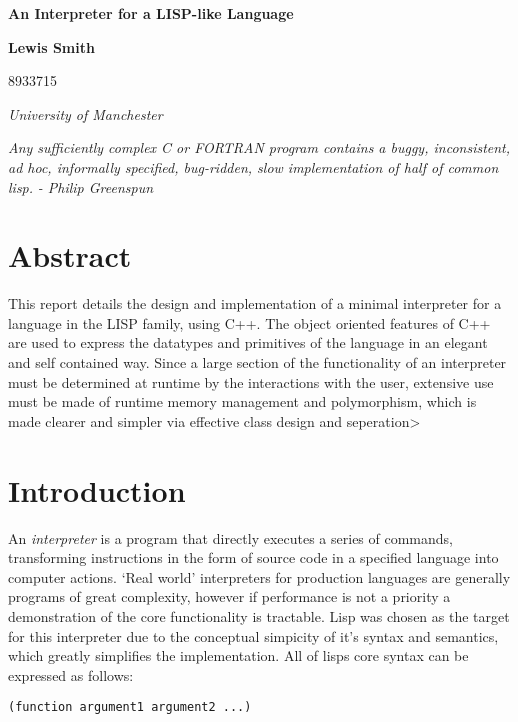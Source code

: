 \documentclass[12pt]{article}
\begin{document}
\lstset{language=Lisp}


\thispagestyle{empty}

\vspace*{15mm}

\begin{center}
{\Large\bf
An Interpreter for a LISP-like Language
}

\vspace*{5mm}

\end{center}
\vspace*{5mm} \noindent
\vskip 0.5cm
\centerline{\bf
Lewis Smith
}
\centerline{
8933715
}

\vskip 5mm
\vskip 5mm
\centerline{\em University of Manchester }
\vskip 5mm

\begin{center}
\textit{
Any sufficiently complex C or FORTRAN program contains a buggy, inconsistent, ad hoc, informally 
specified, bug-ridden, slow implementation of half of common lisp.} 
\vskip 5mm
\textit{ - Philip Greenspun}
\end{center}


\vskip 20mm
\vskip 20mm
\section*{Abstract} 
This report details the design and implementation of a minimal interpreter for a language in the LISP family, 
using C++.  The object oriented features of C++ are used to express the datatypes and primitives of the 
language in an elegant and self contained way. Since a large section of the functionality of an interpreter must 
be determined at runtime by the interactions with the user, extensive use must be made of runtime memory 
management and polymorphism, which is made clearer and simpler via effective class design and seperation>
\section{ Introduction }

An \textit{interpreter} is a program that directly executes a series of commands, transforming instructions in 
the form of source code in a specified language into computer actions. `Real world' interpreters for production languages are generally programs of great complexity, however if performance is not a priority a demonstration of the core functionality is tractable. Lisp was chosen as the target for this interpreter due to the conceptual simpicity of it's syntax and semantics, which greatly simplifies the implementation. All of lisps core syntax 
can be expressed as follows:
\begin{lstlisting}
(function argument1 argument2 ...)
\end{lstlisting}
\end{document}
